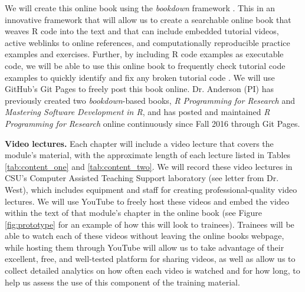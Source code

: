 \documentclass[pdftex,english,11pt,parskip=half]{scrartcl}
\begin{document}
We will create this online book using the \textit{bookdown} framework
\cite{xie2016bookdown}. This in an innovative framework that will allow us to
create a searchable online book that weaves R code into the text and that can
include embedded tutorial videos, active weblinks to online references, and
computationally reproducible practice examples and exercises. Further, by
including R code examples as executable code, we will be able to use this online
book to frequently check tutorial code examples to quickly identify and fix any
broken tutorial code \cite{xie2016bookdown}. We will use GitHub's Git Pages to
freely post this book online. Dr. Anderson (PI) has previously created two
\textit{bookdown}-based books, \textit{R Programming for Research} and
\textit{Mastering Software Development in R}, and has posted and maintained
\textit{R Programming for Research} online continuously since Fall 2016 through
Git Pages.  

\textbf{Video lectures.} Each chapter will include a video lecture that covers
the module's material, with the approximate length of each lecture listed in
Tables \ref{tab:content_one} and \ref{tab:content_two}. We will record these
video lectures in CSU's Computer Assisted Teaching Support laboratory (see
letter from Dr. West), which includes equipment and staff for creating
professional-quality video lectures. We will use YouTube to freely host these
videos and embed the video within the text of that module's chapter in the
online book (see Figure \ref{fig:prototype} for an example of how this will look
to trainees). Trainees will be able to watch each of these videos without
leaving the online books webpage, while hosting them through YouTube will allow
us to take advantage of their excellent, free, and well-tested platform for
sharing videos, as well as allow us to collect detailed analytics on how often
each video is watched and for how long, to help us assess the use of this
component of the training material. 
\end{document}
